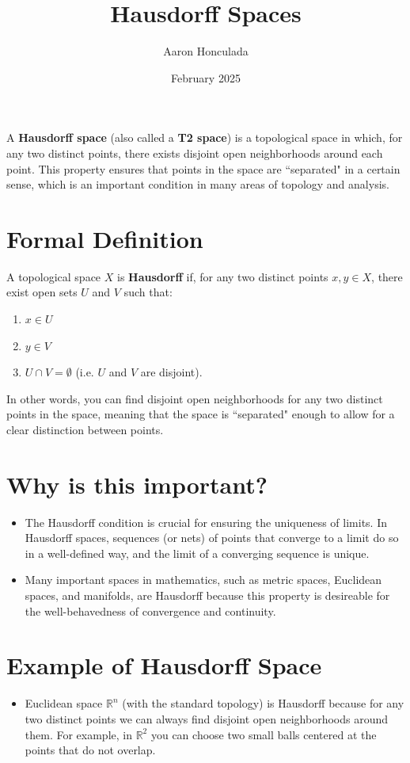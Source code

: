 \documentclass{article}
\title{Hausdorff Spaces}
\author{Aaron Honculada}
\date{February 2025}
\begin{document}
\maketitle

A \textbf{Hausdorff space} (also called a \textbf{T2 space}) is a topological space in which, for any two distinct points,
there exists disjoint open neighborhoods around each point. This property ensures that points in the space are ``separated"
in a certain sense, which is an important condition in many areas of topology and analysis.

\section{Formal Definition}
\hypertarget{hausdorff-definition}{}
A topological space $X$ is \textbf{Hausdorff} if, for any two distinct points $x, y \in X$, there exist open
sets $U$ and $V$ such that:
\begin{enumerate}
    \item $x \in U$
    \item $y \in V$
    \item $U \cap V = \emptyset$ (i.e. $U$ and $V$ are disjoint).
\end{enumerate}
In other words, you can find disjoint open neighborhoods for any two distinct points in the space, meaning that
the space is ``separated" enough to allow for a clear distinction between points.

\section{Why is this important?}
\begin{itemize}
    \item The Hausdorff condition is crucial for ensuring the uniqueness of limits. In Hausdorff spaces, sequences
    (or nets) of points that converge to a limit do so in a well-defined way, and the limit of a converging
    sequence is unique.
    \item Many important spaces in mathematics, such as metric spaces, Euclidean spaces, and manifolds, are Hausdorff
    because this property is desireable for the well-behavedness of convergence and continuity.
\end{itemize}


\section{Example of Hausdorff Space}
\begin{itemize}
    \item Euclidean space $\mathbb{R}^n$ (with the standard topology) is Hausdorff because
    for any two distinct points we can always find disjoint open neighborhoods around them. For example,
    in $\mathbb{R}^2$ you can choose two small balls centered at the points that do not overlap.
\end{itemize}
\end{document}
